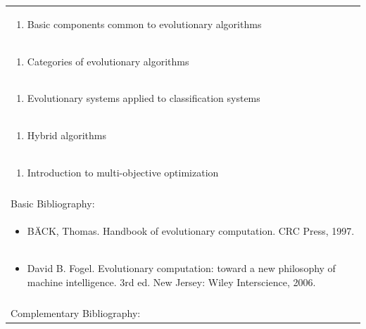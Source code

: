 \documentclass[11pt]{article}
\begin{document}
\begin{center}
\begin{longtable}{|p{4cm}|p{4cm}|p{4cm}|p{4cm}|}
\multicolumn{4}{|p{\dimexpr 16cm + 6\tabcolsep\relax}|}{\begin{enumerate}[start=2]\item Basic components common to evolutionary algorithms\end{enumerate}}\\
\multicolumn{4}{|p{\dimexpr 16cm + 6\tabcolsep\relax}|}{\begin{enumerate}[start=3]\item Categories of evolutionary algorithms\end{enumerate}}\\
\multicolumn{4}{|p{\dimexpr 16cm + 6\tabcolsep\relax}|}{\begin{enumerate}[start=4]\item Evolutionary systems applied to classification systems\end{enumerate}}\\
\multicolumn{4}{|p{\dimexpr 16cm + 6\tabcolsep\relax}|}{\begin{enumerate}[start=5]\item Hybrid algorithms\end{enumerate}}\\
\multicolumn{4}{|p{\dimexpr 16cm + 6\tabcolsep\relax}|}{\begin{enumerate}[start=6]\item Introduction to multi-objective optimization\end{enumerate}}\\
\multicolumn{4}{|p{\dimexpr 16cm + 6\tabcolsep\relax}|}{}\\
\hline
\multicolumn{4}{|p{16cm}|}{Basic Bibliography:}\\*
\multicolumn{4}{|p{\dimexpr 16cm + 6\tabcolsep\relax}|}{\begin{itemize}\item BÄCK, Thomas. Handbook of evolutionary computation. CRC Press, 1997.\end{itemize}}\\
\multicolumn{4}{|p{\dimexpr 16cm + 6\tabcolsep\relax}|}{\begin{itemize}\item David B. Fogel. Evolutionary computation: toward a new philosophy of machine intelligence. 3rd ed. New Jersey: Wiley Interscience, 2006.\end{itemize}}\\
\multicolumn{4}{|p{16cm}|}{}\\
\hline
\multicolumn{4}{|p{16cm}|}{Complementary Bibliography:}\\*

\end{longtable}
\end{center}
\end{document}
